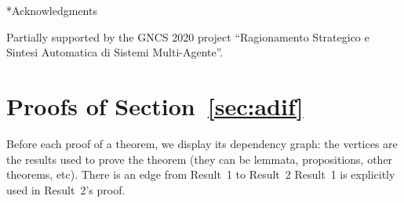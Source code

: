 \documentclass[authoryear]{elsarticle}
\begin{document}

\begin{section}*{Acknowledgments}

Partially supported by the GNCS 2020 project ``Ragionamento Strategico e Sintesi
Automatica di Sistemi Multi-Agente''.

\end{section}





  \newpage
  \appendix




\section{Proofs of Section~\ref{sec:adif}}
\label{app:adif}

Before each proof of a theorem, we display its dependency graph: the vertices are the results used to prove the theorem (they can be lemmata, propositions, other theorems, etc). There is an edge from Result~1 to Result~2 \iff Result~1 is explicitly used in Result~2's proof.


\newcommand{\asgExt}[2]{#2 \!\rst[][\WSet]\xspace}
\newcommand{\asgExtW}[1]{\asgExt{\WSet}{#1}}
\newcommand{\asgExtWX}{\asgExtW{\TeamAsg}}
\end{document}
